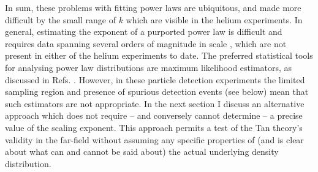 	In sum, these problems with fitting power laws are ubiquitous, and made more difficult by the small range of $k$ which are visible in the helium experiments.
	In general, estimating the exponent of a purported power law is difficult and requires data spanning several orders of magnitude in scale \cite{Goldstein04,Clauset09,Virkar14,Hanel17}, which are not present in either {of the} helium experiment{s to date}.
	The preferred statistical tools for analysing power law distributions are maximum likelihood estimators, as discussed in Refs. \cite{Clauset09,Virkar14}.
	However, in these particle detection experiments the limited sampling region and presence of spurious detection events (see below) mean that such estimators are not appropriate.
	In the next section I discuss an alternative approach which does not require -- and conversely cannot determine -- a precise value of the scaling exponent.
	This approach permits a test of the Tan theory's validity in the far-field without assuming any specific properties of (and is clear about what can and cannot be said about) the actual underlying density distribution.
	
